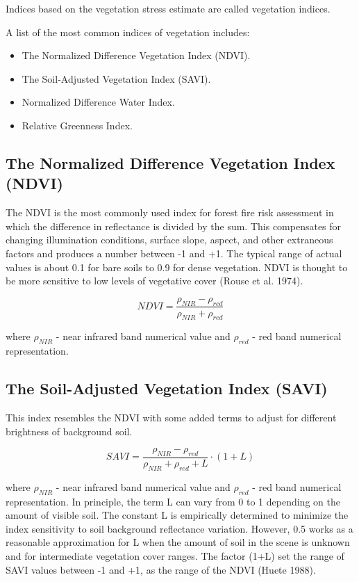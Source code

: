 {{{	Indices based on the vegetation stress estimate are called vegetation indices.
	
	A list of the most common indices of vegetation includes: 
	
	\begin{itemize}
		\item The Normalized Difference Vegetation Index (NDVI).
		\item The Soil-Adjusted Vegetation Index (SAVI).
		\item Normalized Difference Water Index.
		\item Relative Greenness Index.
	\end{itemize}

\subsection{The Normalized Difference Vegetation Index (NDVI)}
	The NDVI is the most commonly used index for forest fire risk assessment in which the difference in reflectance is divided by the sum. This compensates for changing illumination conditions, surface slope, aspect, and other extraneous factors and produces a number between -1 and +1. The typical range of actual values is about 0.1 for bare soils to 0.9 for dense vegetation. NDVI is thought to be more sensitive to low levels of vegetative cover (Rouse et al. 1974).
	
	\begin{equation}
	NDVI = \dfrac{\rho_{NIR} - \rho_{red}}{\rho_{NIR} + \rho_{red}}
	\end{equation}
	
	where $\rho_{NIR}$ - near infrared band numerical value and $\rho_{red}$ - red band numerical representation.
	
\subsection{The Soil-Adjusted Vegetation Index (SAVI)}
	This index resembles the NDVI with some added terms to adjust for different brightness of background soil. 
	
	\begin{equation}
	SAVI = \dfrac{\rho_{NIR} - \rho_{red}}{\rho_{NIR} + \rho_{red} + L} \cdot (1 + L)
	\end{equation}
	
	where $\rho_{NIR}$ - near infrared band numerical value and $\rho_{red}$ - red band numerical representation. In principle, the term L can vary from 0 to 1 depending on the amount of visible soil. The constant L is empirically determined to minimize the index sensitivity to soil background reflectance
	variation. However, 0.5 works as a reasonable approximation for L when the amount of soil in the
	scene is unknown and for intermediate vegetation cover ranges. The factor (1+L) set the range of
	SAVI values between -1 and +1, as the range of the NDVI (Huete 1988).

}}}
